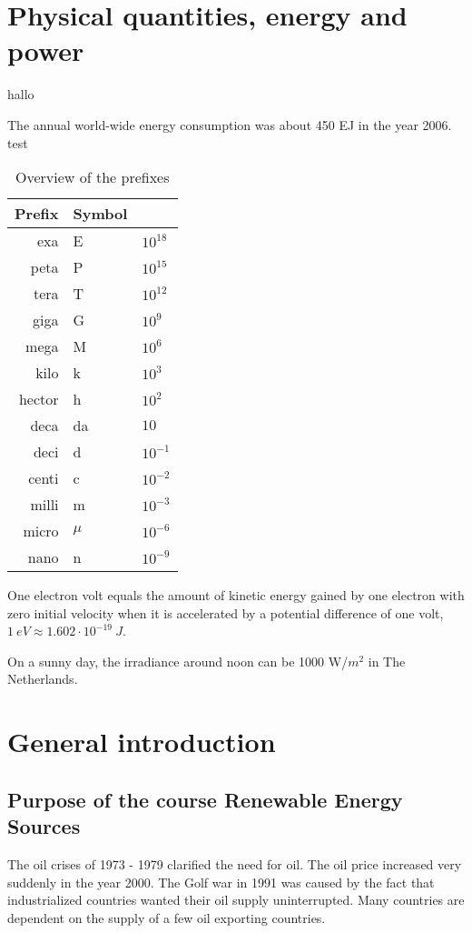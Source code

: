 \documentclass[a4paper,10pt]{article}
\begin{document}
\section{Physical quantities, energy and power}
hallo

The annual world-wide energy consumption was about 450 EJ in the year 2006.
test

\begin{table}[ht]
\centering
 \begin{tabular}{r|ll}
  Prefix & Symbol & \\ \hline
  exa & E & $10^{18}$ \\
  peta & P & $10^{15}$ \\
  tera & T & $10^{12}$ \\
  giga & G & $10^{9}$ \\
  mega & M & $10^{6}$ \\
  kilo & k & $10^{3}$ \\
  hector & h & $10^{2}$ \\
  deca & da & $10$ \\
  deci& d & $10^{-1}$\\
  centi& c&$10^{-2}$\\
  milli& m&$10^{-3}$\\
  micro& $\mu$&$10^{-6}$\\
  nano& n&$10^{-9}$\\
 \end{tabular}
\caption{Overview of the prefixes}
\label{tab:prefixes}
\end{table}
One electron volt equals the amount of kinetic energy gained by one electron with zero initial velocity when it is accelerated by a potential difference of one volt, $1 \ eV \approx 1.602 \cdot 10^{-19}\ J$. \bigskip

On a sunny day, the irradiance around noon can be 1000 W/$m^2$ in The Netherlands.


\section{General introduction}

\subsection{Purpose of the course Renewable Energy Sources}
The oil crises of 1973 - 1979 clarified the need for oil. The oil price increased very suddenly in the year 2000. The Golf war in 1991 was caused by the fact that industrialized countries wanted their oil supply uninterrupted. Many countries are dependent on the supply of a few oil exporting countries. \bigskip
\end{document}
